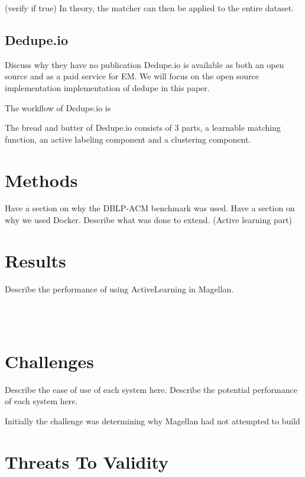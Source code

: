 \documentclass[letterpaper,twocolumn,10pt]{article}
\begin{document}
(verify if true) In theory, the matcher can then be applied to the entire dataset. 





\subsection{Dedupe.io}
Discuss why they have no publication
Dedupe.io is available as both an open source and as a paid service for EM. We will focus on the open source implementation implementation of dedupe in this paper. 

The workflow of Dedupe.io is 

The bread and butter of Dedupe.io consists of 3 parts, a learnable matching function, an active labeling component and a clustering component. 




\section{Methods}
Have a section on why the DBLP-ACM benchmark was used.
Have a section on why we used Docker.
Describe what was done to extend. (Active learning part)


\section{Results}
Describe the performance of using ActiveLearning in Magellan.


\noindent{}
\\\\

\section{Challenges}
Describe the ease of use of each system here.
Describe the potential performance of each system here.

Initially the challenge was determining why Magellan had not attempted to build 








\section{Threats To Validity}
\end{document}
